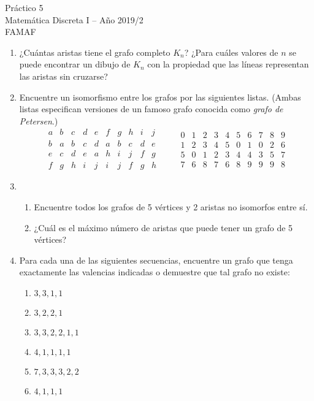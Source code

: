 \documentclass[12pt,spanish,makeidx]{amsbook}
\theoremstyle{definition}
\theoremstyle{remark}
\begin{document}
{\bf \begin{center} Práctico 5 \\ Matemática Discreta I -- Año 2019/2 \\ FAMAF \end{center}}

\medskip




\begin{enumerate}

\item  ¿Cuántas aristas tiene el  grafo completo $K_n$? ¿Para cuáles valores de $n$ se puede encontrar un dibujo de $K_n$ con la propiedad que las líneas representan las aristas sin cruzarse?


\medskip
\item Encuentre un isomorfismo entre los grafos por las siguientes listas. (Ambas listas especifican versiones de un famoso grafo conocida como {\it grafo de Petersen}.)
$$
\begin{matrix}
a&b&c&d&e&f&g&h&i&j\\ \hline
b&a&b&c&d&a&b&c&d&e\\
e&c&d&e&a&h&i&j&f&g\\
f&g&h&i&j&i&j&f&g&h
\end{matrix}
\qquad \begin{matrix}
0&1&2&3&4&5&6&7&8&9\\ \hline
1&2&3&4&5&0&1&0&2&6\\
5&0&1&2&3&4&4&3&5&7\\
7&6&8&7&6&8&9&9&9&8
\end{matrix}
$$

\medskip
\item
\begin{enumerate}
\item Encuentre todos los grafos de 5 vértices y 2 aristas no isomorfos entre sí.
 \item ¿Cuál es el máximo número de aristas que puede tener un grafo de 5 vértices?
\end{enumerate}

\medskip

\item Para cada una de las siguientes secuencias, encuentre un grafo que tenga exactamente las valencias indicadas o demuestre que tal grafo no existe:
\begin{multicols}{3}
\begin{enumerate}
\item $3,3,1,1$
\item $3,2,2,1$
\item $3,3,2,2,1,1$
\item $4,1,1,1,1$
\item $7,3,3,3,2,2$
\item $4,1,1,1$
\end{enumerate}
\end{multicols}


\end{enumerate}
\end{document}
